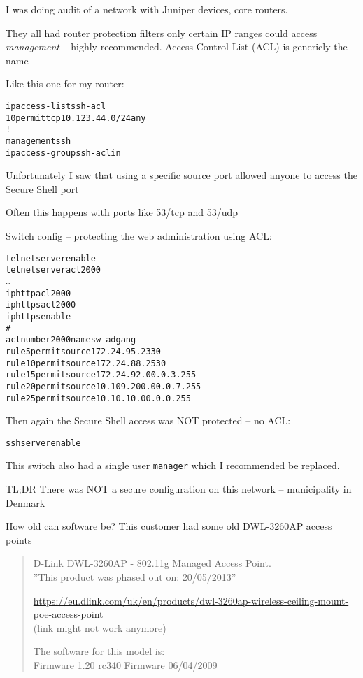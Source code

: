 \documentclass[Screen16to9,17pt]{foils}
\begin{document}
I was doing audit of a network with Juniper devices, core routers.

They all had router protection filters only certain IP ranges could access \emph{management} -- highly recommended. Access Control List (ACL) is genericly the name

Like this one for my router:
\begin{alltt}
ip access-list ssh-acl
   10 permit tcp 10.123.44.0/24 any
!
management ssh
   ip access-group ssh-acl in
\end{alltt}

Unfortunately I saw that using a specific source port allowed anyone to access the Secure Shell port
\begin{list2}
\item Often this happens with ports like 53/tcp and 53/udp
\end{list2}



Switch config -- protecting the web administration using ACL:
\begin{alltt}\scriptsize
telnet server enable
telnet server acl 2000
…
ip http acl 2000
ip https acl 2000
ip https enable
#
acl number 2000 name sw-adgang
rule 5 permit source 172.24.95.233 0
rule 10 permit source 172.24.88.253 0
rule 15 permit source 172.24.92.0 0.0.3.255
rule 20 permit source 10.109.200.0 0.0.7.255
rule 25 permit source 10.10.10.0 0.0.0.255
\end{alltt}

Then again the Secure Shell access was NOT protected -- no ACL:
\begin{alltt}\scriptsize
ssh server enable
\end{alltt}

This switch also had a single user \verb+manager+ which I recommended be replaced.

TL;DR There was NOT a secure configuration on this network -- municipality in Denmark



How old can software be? This customer had some old DWL-3260AP access points

\begin{quote}
D-Link DWL-3260AP - 802.11g Managed Access Point.\\
”This product was phased out on: 20/05/2013”

\url{https://eu.dlink.com/uk/en/products/dwl-3260ap-wireless-ceiling-mount-poe-access-point}\\
 (link might not work anymore)

The software for this model is:\\
Firmware 1.20 rc340 Firmware 06/04/2009
\end{quote}
\end{document}
